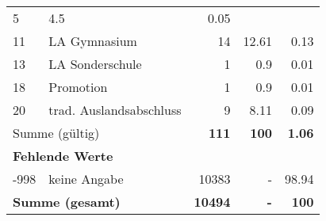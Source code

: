 \begin{longtable}{lXrrr}
       \num{5} &
       \num[round-mode=places,round-precision=2]{4.5} &
         \num[round-mode=places,round-precision=2]{0.05} \\

     11 &
     \multicolumn{1}{X}{ LA Gymnasium   } &


       \num{14} &
       \num[round-mode=places,round-precision=2]{12.61} &
         \num[round-mode=places,round-precision=2]{0.13} \\

     13 &
     \multicolumn{1}{X}{ LA Sonderschule   } &


       \num{1} &
       \num[round-mode=places,round-precision=2]{0.9} &
         \num[round-mode=places,round-precision=2]{0.01} \\

     18 &
     \multicolumn{1}{X}{ Promotion   } &


       \num{1} &
       \num[round-mode=places,round-precision=2]{0.9} &
         \num[round-mode=places,round-precision=2]{0.01} \\

     20 &
     \multicolumn{1}{X}{ trad. Auslandsabschluss   } &


       \num{9} &
       \num[round-mode=places,round-precision=2]{8.11} &
         \num[round-mode=places,round-precision=2]{0.09} \\
     \midrule
     \multicolumn{2}{l}{Summe (gültig)} &
       \textbf{\num{111}} &
     \textbf{\num{100}} &
       \textbf{\num[round-mode=places,round-precision=2]{1.06}} \\
     \multicolumn{5}{l}{\textbf{Fehlende Werte}}\\
       -998 &
       keine Angabe &
         \num{10383} &
        - &
         \num[round-mode=places,round-precision=2]{98.94} \\
     \midrule
     \multicolumn{2}{l}{\textbf{Summe (gesamt)}} &
          \textbf{\num{10494}} &
        \textbf{-} &
        \textbf{\num{100}} \\
     \bottomrule
     \end{longtable}
     

